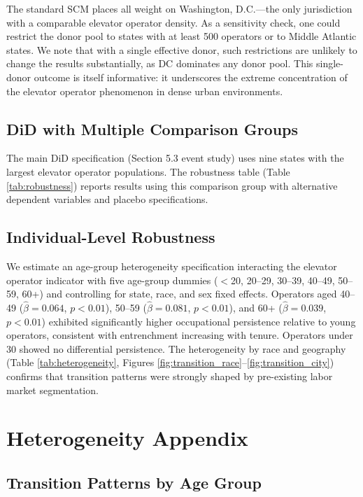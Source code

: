 \documentclass[12pt]{article}
\begin{document}
The standard SCM places all weight on Washington, D.C.---the only jurisdiction with a comparable elevator operator density. As a sensitivity check, one could restrict the donor pool to states with at least 500 operators or to Middle Atlantic states. We note that with a single effective donor, such restrictions are unlikely to change the results substantially, as DC dominates any donor pool. This single-donor outcome is itself informative: it underscores the extreme concentration of the elevator operator phenomenon in dense urban environments.

\subsection{DiD with Multiple Comparison Groups}

The main DiD specification (Section 5.3 event study) uses nine states with the largest elevator operator populations. The robustness table (Table \ref{tab:robustness}) reports results using this comparison group with alternative dependent variables and placebo specifications.

\subsection{Individual-Level Robustness}

We estimate an age-group heterogeneity specification interacting the elevator operator indicator with five age-group dummies ($<$20, 20--29, 30--39, 40--49, 50--59, 60+) and controlling for state, race, and sex fixed effects. Operators aged 40--49 ($\hat{\beta} = 0.064$, $p < 0.01$), 50--59 ($\hat{\beta} = 0.081$, $p < 0.01$), and 60+ ($\hat{\beta} = 0.039$, $p < 0.01$) exhibited significantly higher occupational persistence relative to young operators, consistent with entrenchment increasing with tenure. Operators under 30 showed no differential persistence. The heterogeneity by race and geography (Table \ref{tab:heterogeneity}, Figures \ref{fig:transition_race}--\ref{fig:transition_city}) confirms that transition patterns were strongly shaped by pre-existing labor market segmentation.

\section{Heterogeneity Appendix}

\subsection{Transition Patterns by Age Group}
\end{document}
